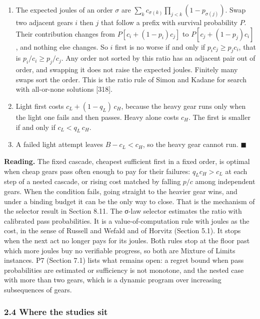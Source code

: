 \documentclass[
  10pt,
]{article}
\newcounter{none} %
\providecommand{\tightlist}{%
  \setlength{\itemsep}{0pt}\setlength{\parskip}{0pt}}
\begin{document}
\begin{enumerate}
\def\labelenumi{\arabic{enumi}.}
\tightlist
\item
  The expected joules of an order \(\sigma\) are
  \(\sum_k c_{\sigma(k)} \prod_{j<k}(1 - p_{\sigma(j)})\). Swap two
  adjacent gears \(i\) then \(j\) that follow a prefix with survival
  probability \(P\). Their contribution changes from
  \(P[c_i + (1-p_i)c_j]\) to \(P[c_j + (1-p_j)c_i]\), and nothing else
  changes. So \(i\) first is no worse if and only if
  \(p_i c_j \ge p_j c_i\), that is \(p_i/c_i \ge p_j/c_j\). Any order
  not sorted by this ratio has an adjacent pair out of order, and
  swapping it does not raise the expected joules. Finitely many swaps
  sort the order. This is the ratio rule of Simon and Kadane for search
  with all-or-none solutions {[}318{]}.
\item
  Light first costs \(c_L + (1-q_L)\,c_H\), because the heavy gear runs
  only when the light one fails and then passes. Heavy alone costs
  \(c_H\). The first is smaller if and only if \(c_L < q_L\,c_H\).
\item
  A failed light attempt leaves \(B - c_L < c_H\), so the heavy gear
  cannot run. \(\blacksquare\)
\end{enumerate}

\textbf{Reading.} The fixed cascade, cheapest sufficient first in a
fixed order, is optimal when cheap gears pass often enough to pay for
their failures: \(q_L c_H > c_L\) at each step of a nested cascade, or
rising cost matched by falling \(p/c\) among independent gears. When the
condition fails, going straight to the heavier gear wins, and under a
binding budget it can be the only way to close. That is the mechanism of
the selector result in Section 8.11. The σ-law selector estimates the
ratio with calibrated pass probabilities. It is a value-of-computation
rule with joules as the cost, in the sense of Russell and Wefald and of
Horvitz (Section 5.1). It stops when the next act no longer pays for its
joules. Both rules stop at the floor past which more joules buy no
verifiable progress, so both are Mixture of Limits instances. P7
(Section 7.1) lists what remains open: a regret bound when pass
probabilities are estimated or sufficiency is not monotone, and the
nested case with more than two gears, which is a dynamic program over
increasing subsequences of gears.

\subsubsection{2.4 Where the studies sit}\label{where-the-studies-sit}
\end{document}
